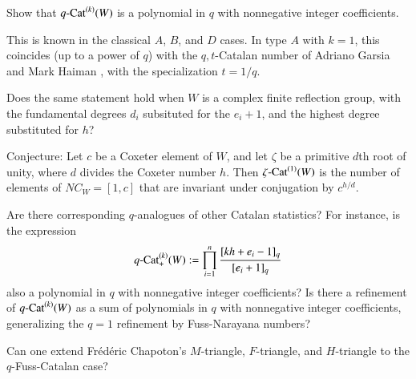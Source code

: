 \documentclass[12pt,letterpaper, reqno]{aimpl}
\newcommand{\Cat}{{\rm Cat}}
\begin{document}
\begin{problemblock}
\begin{problem}[2.1]\label{prob:qcat} Show that $q\text{-\Cat}^{(k)}(W)$ is a polynomial in $q$ with nonnegative integer coefficients.\end{problem}

This is known in the classical $A$, $B$, and $D$ cases. In type $A$ with $k=1$, this coincides (up to a power of $q$) with the $q,t$-Catalan number of Adriano Garsia and Mark Haiman \cite{garsia-haiman}, with the specialization $t=1/q$.

\begin{remark}
 Does the same statement hold when $W$ is a complex finite reflection group, with the fundamental degrees $d_i$ subsituted for the $e_i+1$, and the highest degree substituted for $h$?
\end{remark}

\begin{remark}
 Conjecture: Let $c$ be a Coxeter element of $W$, and let $\zeta$ be a primitive $d$th root of unity, where $d$ divides the Coxeter number $h$. Then $\zeta\text{-\Cat}^{(1)}(W)$ is the number of elements of $NC_W=[1,c]$ that are invariant under conjugation by $c^{h/d}$.
\end{remark}

\begin{remark}
 Are there corresponding $q$-analogues of other Catalan statistics? For instance, is the expression
\begin{equation*}
q\text{-\Cat}^{(k)}_+(W):=\prod_{i=1}^n \frac{[kh+e_i-1]_q}{[e_i+1]_q}
\end{equation*}
also a polynomial in $q$ with nonnegative integer coefficients? Is there a refinement of $q\text{-\Cat}^{(k)}(W)$ as a sum of polynomials in $q$ with nonnegative integer coefficients, generalizing the $q=1$ refinement by Fuss-Narayana numbers?
\end{remark}

\begin{remark}
Can one extend Fr\'ed\'eric Chapoton's $M$-triangle, $F$-triangle, and $H$-triangle to the $q$-Fuss-Catalan case?
\end{remark}

\end{problemblock}
\end{document}
